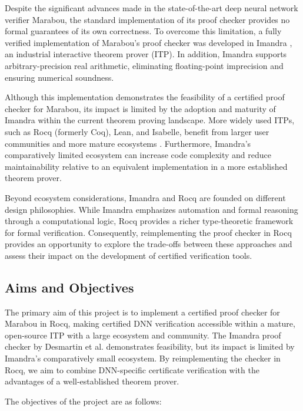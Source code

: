 Despite the significant advances made in the state-of-the-art deep neural network verifier Marabou, the standard implementation of its proof checker provides no formal guarantees of its own correctness. To overcome this limitation, a fully verified implementation of Marabou's proof checker was developed in Imandra \cite{certified_proof_checker}, an industrial interactive theorem prover (ITP). In addition, Imandra supports arbitrary-precision real arithmetic, eliminating floating-point imprecision and ensuring numerical soundness.


Although this implementation demonstrates the feasibility of a certified proof checker for Marabou, its impact is limited by the adoption and maturity of Imandra within the current theorem proving landscape. More widely used ITPs, such as Rocq (formerly Coq), Lean, and Isabelle, benefit from larger user communities and more mature ecosystems \cite{survey_coq_users}. Furthermore, Imandra's comparatively limited ecosystem can increase code complexity and reduce maintainability relative to an equivalent implementation in a more established theorem prover.

Beyond ecosystem considerations, Imandra and Rocq are founded on different design philosophies. While Imandra emphasizes automation and formal reasoning through a computational logic, Rocq provides a richer type-theoretic framework for formal verification. Consequently, reimplementing the proof checker in Rocq provides an opportunity to explore the trade-offs between these approaches and assess their impact on the development of certified verification tools.



\subsection{Aims and Objectives}

The primary aim of this project is to implement a certified proof checker for Marabou in Rocq, making certified DNN verification accessible within a mature, open-source ITP with a large ecosystem and community. The Imandra proof checker by Desmartin et al. \cite{certified_proof_checker} demonstrates feasibility, but its impact is limited by Imandra's comparatively small ecosystem. By reimplementing the checker in Rocq, we aim to combine DNN-specific certificate verification with the advantages of a well-established theorem prover.

The objectives of the project are as follows:

